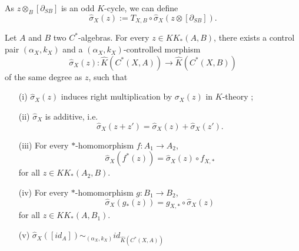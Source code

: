 As $z\otimes_B [\partial_{SB}]$ is an odd $K$-cycle, we can define
\[\hat\sigma_X(z):= T_{X,B}\circ \hat\sigma_X(z\otimes[\partial_{SB}]).\] 


\begin{prop}\label{Roe2}
Let $A$ and $B$ two $C^*$-algebras. For every $z\in KK_*(A,B)$, there exists a control pair $(\alpha_X,k_X)$ and a $(\alpha_X,k_X)$-controlled morphism
\[\hat\sigma_X(z) : \hat K(C^*(X,A))\rightarrow \hat K(C^*(X,B))\]
of the same degree as $z$, such that
\begin{enumerate}
\item[(i)] $\hat\sigma_X(z)$ induces right multiplication by $\sigma_X(z)$ in $K$-theory ;
\item[(ii)] $\hat\sigma_X$ is additive, i.e.
\[\hat\sigma_X(z+z')=\hat\sigma_X(z)+\hat\sigma_X(z').\]
\item[(iii)] For every $*$-homomorphism $f : A_1\rightarrow A_2$,
\[\hat\sigma_X(f^*(z))=\hat\sigma_X(z)\circ f_{X,*}\] for all $z\in KK_*(A_2,B)$.
\item[(iv)] For every $*$-homomorphism $g : B_1\rightarrow B_2$,
\[\hat\sigma_X(g_*(z))= g_{X,*}\circ \hat\sigma_X(z)\] for all $z\in KK_*(A,B_1)$.
\item[(v)] $\hat\sigma_X([id_A]) \sim_{(\alpha_X,k_X)} id_{\hat K(C^*(X,A))}$
\end{enumerate}
\end{prop}

